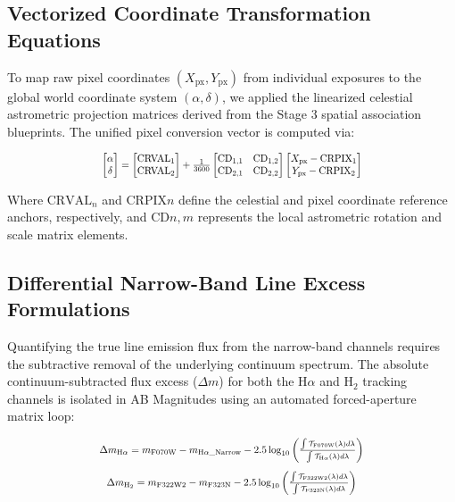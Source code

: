 \documentclass[twocolumn]{aastex63}
\begin{document}
\subsection{Vectorized Coordinate Transformation Equations}
To map raw pixel coordinates $(X_{\text{px}}, Y_{\text{px}})$ from individual exposures to the global world coordinate system $(\alpha, \delta)$, we applied the linearized celestial astrometric projection matrices derived from the Stage 3 spatial association blueprints. The unified pixel conversion vector is computed via:

\begin{equation}
\scalebox{0.80}{%
$\begin{bmatrix} \alpha \\ \delta \end{bmatrix} = \begin{bmatrix} \text{CRVAL}_1 \\ \text{CRVAL}_2 \end{bmatrix} + \frac{1}{3600} \begin{bmatrix} \text{CD}_{1,1} & \text{CD}_{1,2} \\ \text{CD}_{2,1} & \text{CD}_{2,2} \end{bmatrix} \begin{bmatrix} X_{\text{px}} - \text{CRPIX}_1 \\ Y_{\text{px}} - \text{CRPIX}_2 \end{bmatrix}$%
}
\end{equation}

Where $\text{CRVAL}_n$ and $\text{CRPIX}n$ define the celestial and pixel coordinate reference anchors, respectively, and $\text{CD}{n,m}$ represents the local astrometric rotation and scale matrix elements.

\subsection{Differential Narrow-Band Line Excess Formulations}
Quantifying the true line emission flux from the narrow-band channels requires the subtractive removal of the underlying continuum spectrum. The absolute continuum-subtracted flux excess ($\Delta m$) for both the H$\alpha$ and H$_2$ tracking channels is isolated in AB Magnitudes using an automated forced-aperture matrix loop:

\begin{equation}
\scalebox{0.81}{%
$\Delta m_{\text{H}\alpha} = m_{\text{F070W}} - m_{\text{H}\alpha\text{\_Narrow}} - 2.5 \log_{10} \left( \frac{\int \mathcal{T}_{\text{F070W}}(\lambda) d\lambda}{\int \mathcal{T}_{\text{H}\alpha}(\lambda) d\lambda} \right)$%
}
\end{equation}
\begin{equation}
\scalebox{0.81}{%
$\Delta m_{\text{H}_2} = m_{\text{F322W2}} - m_{\text{F323N}} - 2.5 \log_{10} \left( \frac{\int \mathcal{T}_{\text{F322W2}}(\lambda) d\lambda}{\int \mathcal{T}_{\text{F323N}}(\lambda) d\lambda} \right)$%
}
\end{equation}
\end{document}
